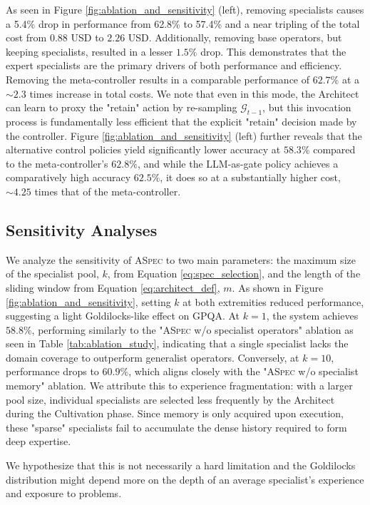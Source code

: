 \documentclass{article} %
\begin{document}
As seen in Figure \ref{fig:ablation_and_sensitivity} (left), removing specialists causes a 5.4\% drop in performance from 62.8\% to 57.4\% and a near tripling of the total cost from \(0.88\) USD to \(2.26\) USD. Additionally, removing base operators, but keeping specialists, resulted in a lesser \(1.5\%\) drop. This demonstrates that the expert specialists are the primary drivers of both performance and efficiency. Removing the meta-controller results in a comparable performance of \(62.7\%\) at a \(\sim 2.3\) times increase in total costs. We note that even in this mode, the Architect can learn to proxy the "retain" action by re-sampling \(\mathcal{G}_{t-1}\), but this invocation process is fundamentally less efficient that the explicit "retain" decision made by the controller. Figure \ref{fig:ablation_and_sensitivity} (left) further reveals that the alternative control policies yield significantly lower accuracy at \(58.3\%\) compared to the meta-controller's \(62.8\%\), and while the LLM-as-gate policy achieves a comparatively high accuracy \(62.5\%\), it does so at a substantially higher cost, \(\sim 4.25\) times that of the meta-controller. 

\subsection{Sensitivity Analyses}
\label{subsec:sensitivity}
We analyze the sensitivity of \textsc{ASpec} to two main parameters: the maximum size of the specialist pool, \(k\), from Equation \ref{eq:spec_selection}, and the length of the sliding window from Equation \ref{eq:architect_def}, \(m\). As shown in Figure \ref{fig:ablation_and_sensitivity}, setting \(k\) at both extremities reduced performance, suggesting a light Goldilocks-like effect on GPQA. At $k = 1$, the system achieves $58.8\%$, performing similarly to the "\textsc{ASpec} w/o specialist operators" ablation as seen in Table \ref{tab:ablation_study}, indicating that a single specialist lacks the domain coverage to outperform generalist operators. Conversely, at $k = 10$, performance drops to $60.9\%$, which aligns closely with the "\textsc{ASpec} w/o specialist memory" ablation. We attribute this to experience fragmentation: with a larger pool size, individual specialists are selected less frequently by the Architect during the Cultivation phase. Since memory is only acquired upon execution, these "sparse" specialists fail to accumulate the dense history required to form deep expertise. 

We hypothesize that this is not necessarily a hard limitation and the Goldilocks distribution might depend more on the depth of an average specialist's experience and exposure to problems. 
\end{document}
